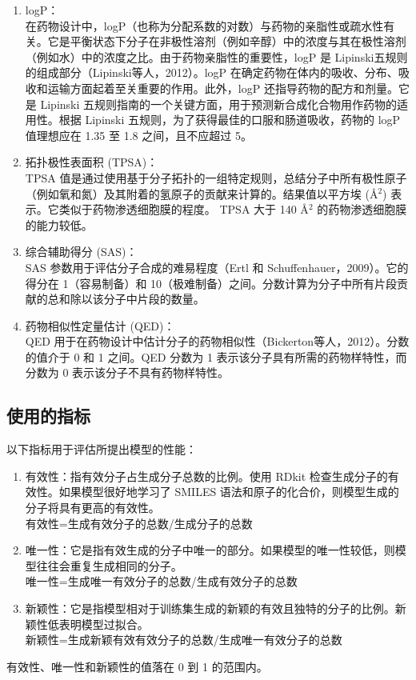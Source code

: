 \begin{enumerate}[label=\alph*)]
  \item logP： \\在药物设计中，logP（也称为分配系数的对数）与药物的亲脂性或疏水性有关。它是平衡状态下分子在非极性溶剂（例如辛醇）中的浓度与其在极性溶剂（例如水）中的浓度之比。由于药物亲脂性的重要性，logP 是 Lipinski五规则的组成部分（Lipinski等人，2012）。logP 在确定药物在体内的吸收、分布、吸收和运输方面起着至关重要的作用。此外，logP 还指导药物的配方和剂量。它是 Lipinski 五规则指南的一个关键方面，用于预测新合成化合物用作药物的适用性。根据 Lipinski 五规则，为了获得最佳的口服和肠道吸收，药物的 logP 值理想应在 1.35 至 1.8 之间，且不应超过 5。
  \item 拓扑极性表面积 (TPSA)：\\TPSA 值是通过使用基于分子拓扑的一组特定规则，总结分子中所有极性原子（例如氧和氮）及其附着的氢原子的贡献来计算的。结果值以平方埃 (Å$^2$) 表示。它类似于药物渗透细胞膜的程度。 TPSA 大于 140 Å$^2$ 的药物渗透细胞膜的能力较低。
  \item 综合辅助得分 (SAS)：\\SAS 参数用于评估分子合成的难易程度（Ertl 和 Schuffenhauer，2009）。它的得分在 1（容易制备）和 10（极难制备）之间。分数计算为分子中所有片段贡献的总和除以该分子中片段的数量。
  \item 药物相似性定量估计 (QED)：\\QED 用于在药物设计中估计分子的药物相似性（Bickerton等人，2012）。分数的值介于 0 和 1 之间。QED 分数为 1 表示该分子具有所需的药物样特性，而分数为 0 表示该分子不具有药物样特性。
\end{enumerate}

\subsection{使用的指标}

以下指标用于评估所提出模型的性能：


\begin{enumerate}[label=\alph*)]
  \item 有效性：指有效分子占生成分子总数的比例。使用 RDkit 检查生成分子的有效性。如果模型很好地学习了 SMILES 语法和原子的化合价，则模型生成的分子将具有更高的有效性。\\有效性=生成有效分子的总数/生成分子的总数
  \item 唯一性：它是指有效生成的分子中唯一的部分。如果模型的唯一性较低，则模型往往会重复生成相同的分子。\\唯一性=生成唯一有效分子的总数/生成有效分子的总数
  \item 新颖性：它是指模型相对于训练集生成的新颖的有效且独特的分子的比例。新颖性低表明模型过拟合。\\新颖性=生成新颖有效有效分子的总数/生成唯一有效分子的总数
\end{enumerate}
有效性、唯一性和新颖性的值落在 0 到 1 的范围内。

